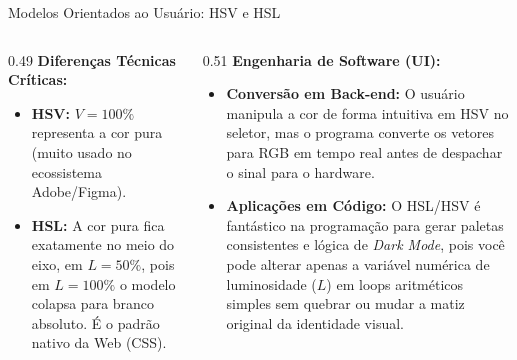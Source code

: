 \begin{frame}{Modelos Orientados ao Usuário: HSV e HSL}
{\begin{columns}[T]
\begin{column}{0.49\textwidth}
                \textbf{Diferenças Técnicas Críticas:}
                \begin{itemize}
                    \setlength{\itemsep}{1pt}
                    \item \textbf{HSV:} $V=100\%$ representa a cor pura (muito usado no ecossistema Adobe/Figma).
                    \item \textbf{HSL:} A cor pura fica exatamente no meio do eixo, em $L=50\%$, pois em $L=100\%$ o modelo colapsa para branco absoluto. É o padrão nativo da Web (CSS).
                \end{itemize}
            \end{column}

            \begin{column}{0.51\textwidth}    
                \scriptsize
                \textbf{Engenharia de Software (UI):}
                \begin{itemize}
                    \setlength{\itemsep}{1pt}
                    \item \textbf{Conversão em Back-end:} O usuário manipula a cor de forma intuitiva em HSV no seletor, mas o programa converte os vetores para RGB em tempo real antes de despachar o sinal para o hardware.
                    \item \textbf{Aplicações em Código:} O HSL/HSV é fantástico na programação para gerar paletas consistentes e lógica de \textit{Dark Mode}, pois você pode alterar apenas a variável numérica de luminosidade ($L$) em loops aritméticos simples sem quebrar ou mudar a matiz original da identidade visual.
                \end{itemize}
            \end{column}
        \end{columns}   
    }
\end{frame}



